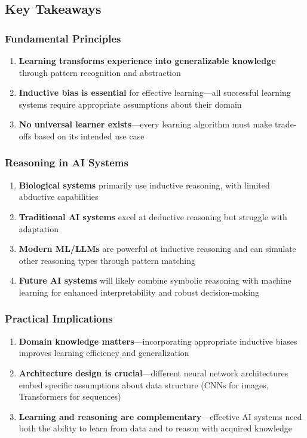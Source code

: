 \subsection{Key Takeaways}
\label{subsec:key-takeaways-ml}

\subsubsection{Fundamental Principles}
\label{subsubsec:fundamental-principles-ml}

\begin{enumerate}
\item \textbf{Learning transforms experience into generalizable knowledge} through pattern recognition and abstraction
\item \textbf{Inductive bias is essential} for effective learning—all successful learning systems require appropriate assumptions about their domain
\item \textbf{No universal learner exists}—every learning algorithm must make trade-offs based on its intended use case
\end{enumerate}

\subsubsection{Reasoning in AI Systems}
\label{subsubsec:reasoning-ai-systems}

\begin{enumerate}
\item \textbf{Biological systems} primarily use inductive reasoning, with limited abductive capabilities
\item \textbf{Traditional AI systems} excel at deductive reasoning but struggle with adaptation
\item \textbf{Modern ML/LLMs} are powerful at inductive reasoning and can simulate other reasoning types through pattern matching
\item \textbf{Future AI systems} will likely combine symbolic reasoning with machine learning for enhanced interpretability and robust decision-making
\end{enumerate}

\subsubsection{Practical Implications}
\label{subsubsec:practical-implications}

\begin{enumerate}
\item \textbf{Domain knowledge matters}—incorporating appropriate inductive biases improves learning efficiency and generalization
\item \textbf{Architecture design is crucial}—different neural network architectures embed specific assumptions about data structure (CNNs for images, Transformers for sequences)
\item \textbf{Learning and reasoning are complementary}—effective AI systems need both the ability to learn from data and to reason with acquired knowledge
\end{enumerate}

